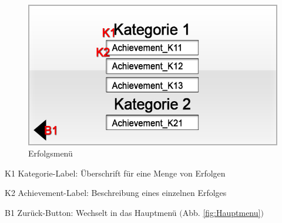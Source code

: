 


\begin{figure}[H]
\centering
\includegraphics[scale=0.55]{../gui/_jpeg_numeration/achievements.jpg}
\caption{Erfolgsmenü}
\label{fig:Erfolgsmenu}
\end{figure}
\begin{description*}
\item[K1] Kategorie-Label: Überschrift für eine Menge von Erfolgen
\item[K2] Achievement-Label: Beschreibung eines einzelnen Erfolges
\item[B1] Zurück-Button: Wechselt in das Hauptmenü $($Abb. \ref{fig:Hauptmenu}$)$
\end{description*}


